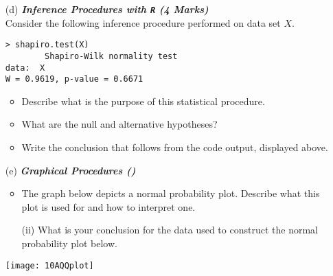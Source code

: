 \newpage
\begin{itemize}

\item[(d)] \textbf{\textit{ Inference Procedures with \texttt{R} (4 Marks)}}\\
Consider the following inference procedure performed on data set $X$.
\begin{center}
\begin{framed}
\begin{verbatim}
> shapiro.test(X)
        Shapiro-Wilk normality test
data:  X
W = 0.9619, p-value = 0.6671
\end{verbatim}
\end{framed}
\end{center}

\begin{itemize}

\item  Describe what is the purpose of this statistical procedure.

\item  What are the null and alternative hypotheses?

\item  Write the conclusion that follows from the code output, displayed above.
\end{itemize}
\end{itemize}

\begin{itemize}

\item[(e)] \textbf{\textit{Graphical Procedures ()}}
\begin{itemize}

\item  The graph below depicts a normal probability plot. Describe what this plot is used for and how to interpret one.

\item[(ii)] What is your conclusion for the data used to construct the normal probability plot below.
\end{itemize}
\begin{center}
\texttt{[image: 10AQQplot]}
\end{center}


\end{itemize}
